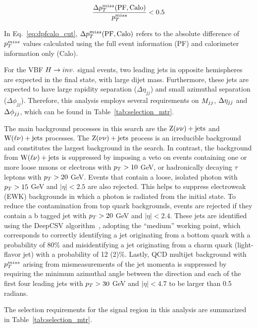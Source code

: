 \begin{equation}
    \frac{\Delta p_T^{miss}(\text{PF},\text{Calo})}{p_T^{miss}} < 0.5
    \label{eq:dpfcalo_cut}
\end{equation}

In Eq.~\ref{eq:dpfcalo_cut}, $\Delta p_T^{miss}(\text{PF},\text{Calo})$ refers to the absolute difference of $p_T^{miss}$ values calculated
using the full event information (PF) and calorimeter information only (Calo).

For the VBF $H \rightarrow inv.$ signal events, two leading jets in opposite hemispheres are expected in the final state, with large dijet mass. 
Furthermore, these jets are expected to have large rapidity separation ($\Delta\eta_{jj}$) and small azimuthal separation ($\Delta\phi_{jj}$). 
Therefore, this analysis employs several requirements on $M_{jj}$, $\Delta \eta_{jj}$ and $\Delta \phi_{jj}$, which can be 
found in Table~\ref{tab:selection_mtr}.

The main background processes in this search are the $\mathrm{Z}(\nu\nu)+\textrm{jets}$ and $\mathrm{W}(\ell\nu)+\textrm{jets}$ processes. The $\mathrm{Z}(\nu\nu)+\textrm{jets}$ process is an irreducible 
background and constitutes the largest background in the search. In contrast, the background from $\mathrm{W}(\ell\nu)+\textrm{jets}$ is suppressed by 
imposing a veto on events containing one or more loose muons or electrons with $p_T >10$ GeV, or hadronically decaying $\tau$ 
leptons with $p_T>20$ GeV. Events that contain a loose, isolated photon with $p_T>15$ GeV and $|\eta| < 2.5$ are also rejected. 
This helps to suppress electroweak (EWK) backgrounds in which a photon is radiated from the initial state.
To reduce the contamination from top quark backgrounds, events are rejected if they contain a b tagged jet with $p_T > 20$ GeV 
and $|\eta| < 2.4$. These jets are identified using the DeepCSV algorithm~\cite{CMS_NOTE_2018-323,Sirunyan:2017ezt}, 
adopting the ``medium'' working point, which corresponds to correctly identifying a jet originating from a bottom quark with 
a probability of 80\% and misidentifying a jet originating from a charm quark (light-flavor jet) with a probability of 12 (2)\%. 
Lastly, QCD multijet background with $p_T^{miss}$ arising from mismeasurements of the jet momenta is suppressed by requiring the minimum
azimuthal angle between the \ptvecmiss direction and each of the first four leading jets with $p_T > 30$ GeV
and $|\eta| < 4.7$ to be larger than 0.5 radians.

The selection requirements for the signal region in this analysis are summarized in Table~\ref{tab:selection_mtr}.

